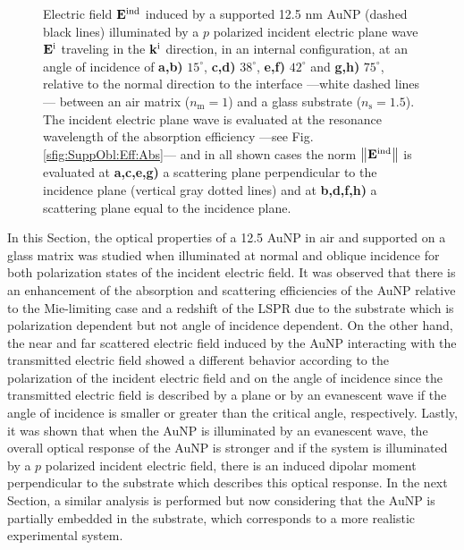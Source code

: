 \begin{figure}[H]
{    Electric field $\vb{E}^\text{ind}$ induced by a supported 12.5 nm AuNP (dashed black lines) illuminated by a $p$ polarized incident electric plane wave $\vb{E}^\text{i}$ traveling in the $\vb{k}^\text{i}$ direction, in an internal configuration, at an angle of incidence of \textbf{a,b)} $15^\circ$, \textbf{c,d)} $38^\circ$, \textbf{e,f)} $42^\circ$ and \textbf{g,h)} $75^\circ$, relative to the normal direction to the interface ---white dashed lines--- between an air matrix ($n_\text{m} = 1$) and a glass substrate ($n_\text{s} = 1.5$). The incident electric plane wave is evaluated at the resonance wavelength of the absorption efficiency ---see Fig. \ref{sfig:SuppObl:Eff:Abs}--- and in all shown cases the norm $\norm{\vb{E}^\text{ind}}$ is evaluated at  \textbf{a,c,e,g)} a scattering plane perpendicular to the incidence plane (vertical gray dotted lines) and at \textbf{b,d,f,h)} a scattering plane equal to the incidence plane.
    }
    \label{fig:Near:SuppObl:p}
  \end{figure}

In this Section, the optical properties of a 12.5 AuNP in air and supported on a glass matrix was studied when illuminated at normal and oblique incidence for both polarization states of the incident electric field. It was observed that there is an enhancement of the absorption and scattering efficiencies of the AuNP relative to the Mie-limiting case and a redshift of the LSPR due to the substrate which is polarization dependent but not angle of incidence dependent. On the other hand, the near and far scattered electric field induced by the AuNP interacting with the transmitted electric field showed a different behavior according to the polarization of the incident electric field and on the angle of incidence since the transmitted electric field is described by a plane or by an evanescent wave if the angle of incidence is smaller or greater than the critical angle, respectively. Lastly, it was shown that when the AuNP is illuminated by an evanescent wave, the overall optical response of the AuNP is stronger and  if the system is illuminated by a $p$ polarized incident electric field, there is an induced dipolar moment perpendicular to the substrate which describes this optical response. In the next Section, a similar analysis is performed but now considering that the AuNP is partially embedded in the substrate, which corresponds to a more realistic experimental system.
